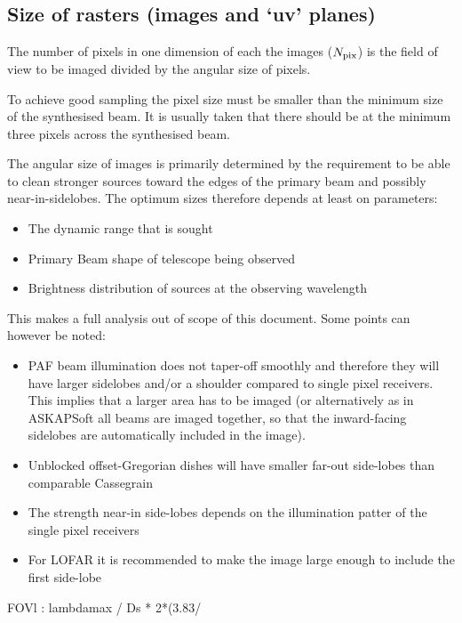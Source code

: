 \documentclass[useAMS,usenatbib,referee]{article}
\begin{document}
\subsection{Size of rasters (images and `uv' planes)}

The number of pixels in one dimension of each the images ($N_{\rm
  pix}$) is the field of view to be imaged divided by the angular size
of pixels. 

To achieve good sampling the pixel size must be smaller than the
minimum size of the synthesised beam. It is usually taken that there
should be at the minimum three pixels across the synthesised beam. 

The angular size of images is primarily determined by the requirement
to be able to clean stronger sources toward the edges of the primary
beam and possibly near-in-sidelobes. The optimum sizes therefore
depends at least on parameters:
\begin{itemize}
  \item The dynamic range that is sought
  \item Primary Beam shape of telescope being observed
  \item Brightness distribution of sources at the observing wavelength
\end{itemize}
This makes a full analysis out of scope of this document. Some points
can however be noted:
\begin{itemize}
\item PAF beam illumination does not taper-off smoothly and therefore
  they will have larger sidelobes and/or a shoulder compared to single
  pixel receivers. This implies that a larger area has to be imaged
  (or alternatively as in ASKAPSoft all beams are imaged together, so
  that the inward-facing sidelobes are automatically included in the
  image).
\item Unblocked offset-Gregorian dishes will have smaller far-out
  side-lobes than comparable Cassegrain 
\item The strength near-in side-lobes depends on the illumination
  patter of the single pixel receivers
\item For LOFAR it is recommended to make the image large enough to
  include the first side-lobe
\end{itemize}

\begin{maxima}[]
FOVl : lambdamax / Ds * 2*(3.83/ %
\maximaoutput*
{} \\
\end{maxima}
\end{document}
